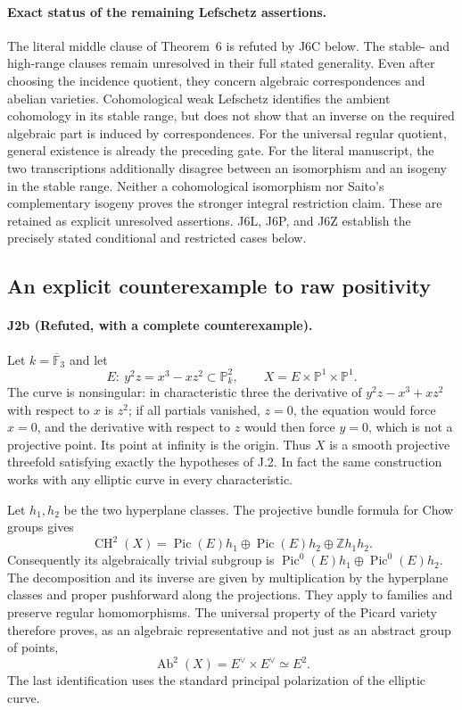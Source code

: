 \paragraph{Exact status of the remaining Lefschetz assertions.}
The literal middle clause of Theorem~6 is refuted by J6C below.
The stable- and high-range clauses remain unresolved in their
full stated generality. Even after choosing the incidence quotient,
they concern algebraic correspondences and abelian varieties.
Cohomological weak Lefschetz identifies the ambient
cohomology in its stable range, but does not show that an inverse
on the required algebraic part is induced by correspondences.
For the universal regular quotient, general existence is already
the preceding gate. For the literal manuscript, the two
transcriptions additionally disagree between an isomorphism and
an isogeny in the stable range. Neither a cohomological
isomorphism nor Saito's complementary isogeny proves the stronger
integral restriction claim. These are retained as explicit
unresolved assertions. J6L, J6P, and J6Z establish the precisely
stated conditional and restricted cases below.

\subsection{An explicit counterexample to raw positivity}
\paragraph{J2b (Refuted, with a complete counterexample).}
Let $k=\overline{\mathbb F}_3$ and let
\[
 E:\ y^2z=x^3-xz^2\subset\mathbb P^2_k,
 \qquad X=E\times\mathbb P^1\times\mathbb P^1.
\]
The curve is nonsingular: in characteristic three the derivative
of $y^2z-x^3+xz^2$ with respect to $x$ is $z^2$; if all partials
vanished, $z=0$, the equation would force $x=0$, and the derivative
with respect to $z$ would then force $y=0$, which is not a
projective point.  Its point at infinity is the origin.  Thus $X$
is a smooth projective threefold satisfying exactly the hypotheses
of J.2.  In fact the same construction works with any elliptic
curve in every characteristic.

Let $h_1,h_2$ be the two hyperplane classes.  The projective bundle
formula for Chow groups \cite[Tag 02TX]{DGJ_StacksPB} gives
\[
 \operatorname{CH}^2(X)=
   \operatorname{Pic}(E)h_1\oplus\operatorname{Pic}(E)h_2
          \oplus\mathbb Z h_1h_2.
\]
Consequently its algebraically trivial subgroup is
$\operatorname{Pic}^0(E)h_1\oplus\operatorname{Pic}^0(E)h_2$.
The decomposition and its inverse are given by multiplication by
the hyperplane classes and proper pushforward along the
projections.  They apply to families and preserve regular
homomorphisms.  The universal property of the Picard variety
therefore proves, as an algebraic representative and not just as
an abstract group of points,
\[
 \operatorname{Ab}^2(X)=E^\vee\times E^\vee\simeq E^2.
\]
The last identification uses the standard principal polarization
of the elliptic curve.

